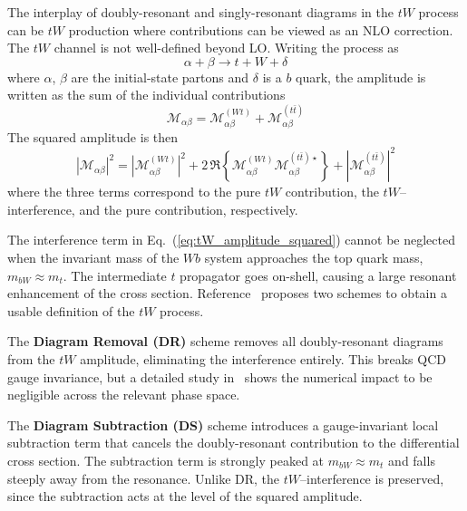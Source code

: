 The interplay of doubly-resonant and singly-resonant diagrams in the $tW$ process can be $tW$ production where \ttbar contributions can be viewed as an NLO correction. The $tW$ channel is not well-defined
beyond LO. Writing the process as
\begin{equation}
    \alpha + \beta \longrightarrow t + W + \delta
    \label{eq:tW_process}
\end{equation}
where $\alpha$, $\beta$ are the initial-state partons and $\delta$ is a $b$ quark, the
amplitude is written as the sum of the individual contributions
\begin{equation}
    \mathcal{M}_{\alpha\beta} = \mathcal{M}_{\alpha\beta}^{(Wt)} + \mathcal{M}_{\alpha\beta}^{(t\bar{t})}
    \label{eq:tW_amplitude}
\end{equation}
The squared amplitude is then
\begin{equation}
    \left|\mathcal{M}_{\alpha\beta}\right|^{2}
    = \left|\mathcal{M}_{\alpha\beta}^{(Wt)}\right|^{2}
    + 2\,\Re\left\{\mathcal{M}_{\alpha\beta}^{(Wt)}\mathcal{M}_{\alpha\beta}^{(t\bar{t})\star}\right\}
    + \left|\mathcal{M}_{\alpha\beta}^{(t\bar{t})}\right|^{2}
    \label{eq:tW_amplitude_squared}
\end{equation}
where the three terms correspond to the pure $tW$ contribution, the $tW$--\ttbar
interference, and the pure \ttbar contribution, respectively.
 
The interference term in Eq.~(\ref{eq:tW_amplitude_squared}) cannot be neglected when the invariant mass of the $Wb$ system approaches the top quark mass, $m_{bW}\approx m_t$. The intermediate $t$ propagator goes on-shell, causing a large resonant
enhancement of the cross section.
Reference~\cite{Frixione:2008yi} proposes two schemes to obtain a
usable definition of the $tW$ process.
 
The \textbf{Diagram Removal (DR)} scheme removes all doubly-resonant diagrams from the
$tW$ amplitude, eliminating the \ttbar interference entirely.
This breaks QCD gauge invariance, but a detailed study in~\cite{Frixione:2008yi} shows
the numerical impact to be negligible across the relevant phase space.
 
The \textbf{Diagram Subtraction (DS)} scheme introduces a gauge-invariant local
subtraction term that cancels the doubly-resonant \ttbar contribution to the differential
cross section.
The subtraction term is strongly peaked at $m_{bW}\approx m_t$ and falls steeply away
from the resonance.
Unlike DR, the $tW$--\ttbar interference is preserved, since the subtraction acts at the
level of the squared amplitude.
 
